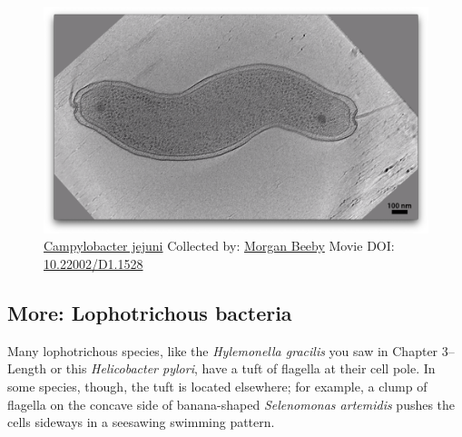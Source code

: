 \documentclass[]{tufte-book}
\begin{document}
\begin{figure}
\includegraphics{movie_stills/6_4} \caption[\protect\hyperlink{tree}{Campylobacter jejuni} Collected by:
\protect\hyperlink{morgan_beeby}{Morgan Beeby} Movie DOI:
\href{https://doi.org/10.22002/D1.1528}{10.22002/D1.1528}]{\protect\hyperlink{tree}{Campylobacter jejuni} Collected by:
\protect\hyperlink{morgan_beeby}{Morgan Beeby} Movie DOI:
\href{https://doi.org/10.22002/D1.1528}{10.22002/D1.1528}}\label{fig:6-4}
\end{figure}

\hypertarget{Lophotrichous_bacteria}{\subsection*{More: Lophotrichous
bacteria}\label{Lophotrichous_bacteria}}

Many lophotrichous species, like the \emph{Hylemonella gracilis} you saw
in Chapter 3--Length or this \emph{Helicobacter pylori}, have a tuft of
flagella at their cell pole. In some species, though, the tuft is
located elsewhere; for example, a clump of flagella on the concave side
of banana-shaped \emph{Selenomonas artemidis} pushes the cells sideways
in a seesawing swimming pattern.
\end{document}
